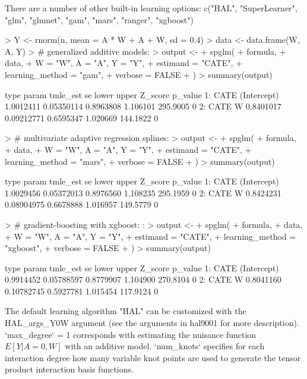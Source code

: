 \documentclass{article}
\begin{document}
There are a number of other built-in learning options: c("HAL", "SuperLearner", "glm", "glmnet", "gam", "mars", "ranger", "xgboost")

\begin{Schunk}
\begin{Sinput}
> Y <- rnorm(n, mean = A * W + A + W, sd = 0.4)
> data <- data.frame(W, A, Y)
> # generalized additive models:
> output <-
+   spglm(
+     formula,
+     data,
+     W = "W", A = "A", Y = "Y",
+     estimand = "CATE",
+     learning_method = "gam",
+     verbose = FALSE
+   )
> summary(output)
\end{Sinput}
\begin{Soutput}
   type       param  tmle_est         se     lower    upper  Z_score p_value
1: CATE (Intercept) 1.0012411 0.05350114 0.8963808 1.106101 295.9005       0
2: CATE           W 0.8401017 0.09212771 0.6595347 1.020669 144.1822       0
\end{Soutput}
\begin{Sinput}
> # multivariate adaptive regression splines:
> output <-
+   spglm(
+     formula,
+     data,
+     W = "W", A = "A", Y = "Y",
+     estimand = "CATE",
+     learning_method = "mars",
+     verbose = FALSE
+   )
> summary(output)
\end{Sinput}
\begin{Soutput}
   type       param  tmle_est         se     lower    upper  Z_score p_value
1: CATE (Intercept) 1.0029456 0.05372013 0.8976560 1.108235 295.1959       0
2: CATE           W 0.8424231 0.08904975 0.6678888 1.016957 149.5779       0
\end{Soutput}
\begin{Sinput}
> # gradient-boosting with xgboost: :
> output <-
+   spglm(
+     formula,
+     data,
+     W = "W", A = "A", Y = "Y",
+     estimand = "CATE",
+     learning_method = "xgboost",
+     verbose = FALSE
+   )
> summary(output) 
\end{Sinput}
\begin{Soutput}
   type       param  tmle_est         se     lower    upper  Z_score p_value
1: CATE (Intercept) 0.9914452 0.05788597 0.8779907 1.104900 270.8104       0
2: CATE           W 0.8041160 0.10782745 0.5927781 1.015454 117.9124       0
\end{Soutput}
\end{Schunk}


The default learning algorithm "HAL" can be customized with the HAL\_args\_Y0W argument (see the arguments in hal9001 for more description). `max\_degree` = 1 corresponds with estimating the nuisance function $E[Y|A=0,W]$ with an additive model. `num\_knots` specifies for each interaction degree how many variable knot points are used to generate the tensor product interaction basis functions. 
\end{document}
